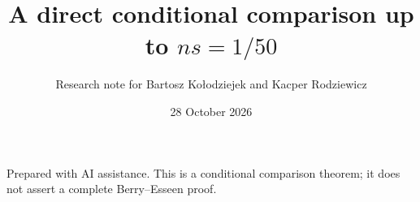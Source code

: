 \documentclass[11pt,a4paper]{article}
\begin{document}
\title{A direct conditional comparison up to $ns=1/50$}
\author{Research note for Bartosz Ko{\l}odziejek and Kacper Rodziewicz}
\date{28 October 2026}
\maketitle
\noindent Prepared with AI assistance. This is a conditional comparison theorem;
it does not assert a complete Berry--Esseen proof.

\end{document}
